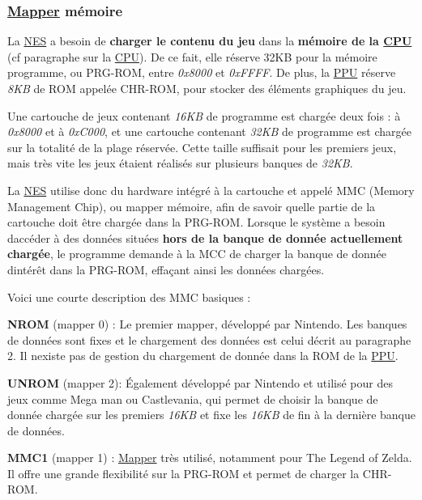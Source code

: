 \subsubsection*{\hyperlink{struct_mapper}{Mapper} mémoire}

La \hyperlink{struct_n_e_s}{N\+ES} a besoin de {\bfseries charger le contenu du jeu} dans la {\bfseries mémoire de la \hyperlink{struct_c_p_u}{C\+PU}} (cf paragraphe sur la \hyperlink{struct_c_p_u}{C\+PU}). De ce fait, elle réserve 32\+KB pour la mémoire programme, ou P\+R\+G-\/\+R\+OM, entre {\itshape 0x8000} et {\itshape 0x\+F\+F\+FF}. De plus, la \hyperlink{struct_p_p_u}{P\+PU} réserve {\itshape 8\+KB} de R\+OM appelée C\+H\+R-\/\+R\+OM, pour stocker des éléments graphiques du jeu.

Une cartouche de jeux contenant {\itshape 16\+KB} de programme est chargée deux fois \+: à {\itshape 0x8000} et à {\itshape 0x\+C000}, et une cartouche contenant {\itshape 32\+KB} de programme est chargée sur la totalité de la plage réservée. Cette taille suffisait pour les premiers jeux, mais très vite les jeux étaient réalisés sur plusieurs banques de {\itshape 32\+KB}.

La \hyperlink{struct_n_e_s}{N\+ES} utilise donc du hardware intégré à la cartouche et appelé M\+MC (Memory Management Chip), ou mapper mémoire, afin de savoir quelle partie de la cartouche doit être chargée dans la P\+R\+G-\/\+R\+OM. Lorsque le système a besoin d\textquotesingle{}accéder à des données situées {\bfseries hors de la banque de donnée actuellement chargée}, le programme demande à la M\+CC de charger la banque de donnée d\textquotesingle{}intérêt dans la P\+R\+G-\/\+R\+OM, effaçant ainsi les données chargées.

Voici une courte description des M\+MC basiques \+:
\begin{DoxyItemize}
\item {\bfseries N\+R\+OM} (mapper 0) \+: Le premier mapper, développé par Nintendo. Les banques de données sont fixes et le chargement des données est celui décrit au paragraphe 2. Il n\textquotesingle{}existe pas de gestion du chargement de donnée dans la R\+OM de la \hyperlink{struct_p_p_u}{P\+PU}.
\item {\bfseries U\+N\+R\+OM} (mapper 2)\+: Également développé par Nintendo et utilisé pour des jeux comme Mega man ou Castlevania, qui permet de choisir la banque de donnée chargée sur les premiers {\itshape 16\+KB} et fixe les {\itshape 16\+KB} de fin à la dernière banque de données.
\item {\bfseries M\+M\+C1} (mapper 1) \+: \hyperlink{struct_mapper}{Mapper} très utilisé, notamment pour The Legend of Zelda. Il offre une grande flexibilité sur la P\+R\+G-\/\+R\+OM et permet de charger la C\+H\+R-\/\+R\+OM.
\end{DoxyItemize}

